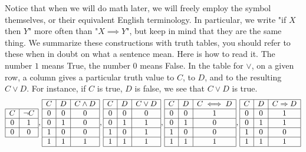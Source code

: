 Notice that when we will do math later, we will freely employ the symbol themselves, or their equivalent English terminology. In particular, we write "if \( X \) then \( Y \)" more often than "\( X \implies Y \)", but keep in mind that they are the same thing. We summarize these constructions with truth tables, you should refer to these when in doubt on what a sentence mean. Here is how to read it. The number \( 1 \) means True, the number \( 0 \) means False. In the table for \( \lor \), on a given row, a column gives a particular truth value to \( C \), to \( D \), and to the resulting \( C \lor D \). For instance, if \( C \) is true, \( D \) is false, we see that \( C \lor D \) is true.  
\begin{equation*}
    \begin{array}{| c | c |}
        \hline
        C & \neg C \\
        \hline
        0 & 1 \\
        \hline
        0 & 0 \\
        \hline
    \end{array},
    \begin{array}{| c | c | c |}
        \hline
        C & D & C \land D \\
        \hline
        0 & 0 & 0 \\
        \hline
        0 & 1 & 0 \\
        \hline
        1 & 0 & 0 \\
        \hline
        1 & 1 & 1 \\
        \hline
    \end{array},
    \begin{array}{| c | c | c |}
        \hline
        C & D & C \lor D \\
        \hline
        0 & 0 & 0 \\
        \hline
        0 & 1 & 1 \\
        \hline
        1 & 0 & 1 \\
        \hline
        1 & 1 & 1 \\
        \hline
    \end{array},
    \begin{array}{| c | c | c |}
        \hline
        C & D & C \iff D \\
        \hline
        0 & 0 & 1 \\
        \hline
        0 & 1 & 0 \\
        \hline
        1 & 0 & 0 \\
        \hline
        1 & 1 & 1 \\
        \hline
    \end{array},
    \begin{array}{| c | c | c |}
        \hline
        C & D & C \implies D \\
        \hline
        0 & 0 & 1 \\
        \hline
        0 & 1 & 1 \\
        \hline
        1 & 0 & 0 \\
        \hline
        1 & 1 & 1 \\
        \hline
    \end{array}
\end{equation*}


